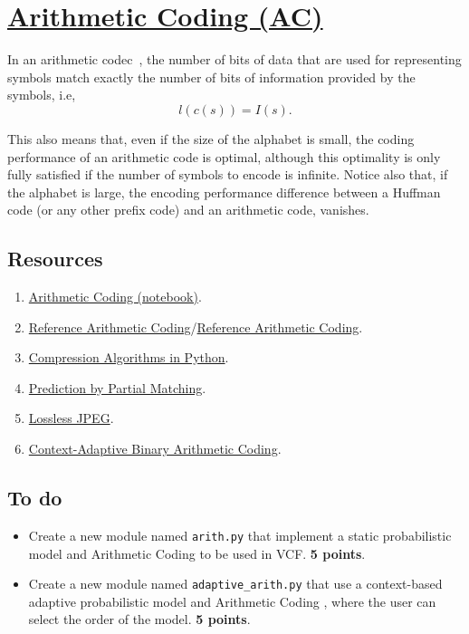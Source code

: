 \section{\href{https://en.wikipedia.org/wiki/Arithmetic_coding}{Arithmetic
    Coding (AC)}}

In an arithmetic codec~\cite{vruiz__arithmetic_coding,ruiz2000compresion}, the number of
bits of data that are used for representing symbols match
exactly the number of bits of information provided by the symbols, i.e,
\begin{equation}
  l(c(s)) = I(s).
\end{equation}

This also means that, even if the size of the alphabet is small, the
coding performance of an arithmetic code is optimal, although this
optimality is only fully satisfied if the number of symbols to encode
is infinite. Notice also that, if the alphabet is large, the encoding
performance difference between a Huffman code (or any other prefix
code) and an arithmetic code, vanishes.

\subsection*{Resources}
\begin{enumerate}
\item
  \href{https://github.com/vicente-gonzalez-ruiz/arithmetic_coding/blob/master/src/arithmetic_coding.ipynb}{Arithmetic
    Coding (notebook)}.
\item \href{https://www.nayuki.io/page/reference-arithmetic-coding}{Reference Arithmetic Coding}/\href{https://github.com/nayuki/Reference-arithmetic-coding}{Reference Arithmetic Coding}.
\item \href{https://www.inference.org.uk/mackay/python/compress/#AC}{Compression Algorithms in Python}.
\item \href{https://en.wikipedia.org/wiki/Prediction_by_partial_matching}{Prediction by Partial Matching}.
\item \href{https://en.wikipedia.org/wiki/Lossless_JPEG}{Lossless JPEG}.
\item \href{https://en.wikipedia.org/wiki/Context-adaptive_binary_arithmetic_coding}{Context-Adaptive Binary Arithmetic Coding}.
\end{enumerate}

\subsection*{To do}
\begin{itemize}
\item Create a new module named \texttt{arith.py} that implement a
  static probabilistic model and Arithmetic Coding
  \cite{nelson96datacompression} to be used in VCF. \textbf{5 points}.
\item Create a new module named \texttt{adaptive\_arith.py} that use
  a context-based adaptive probabilistic model and Arithmetic Coding
  \cite{nelson96datacompression}, where the user can select the order
  of the model. \textbf{5 points}.
\end{itemize}

